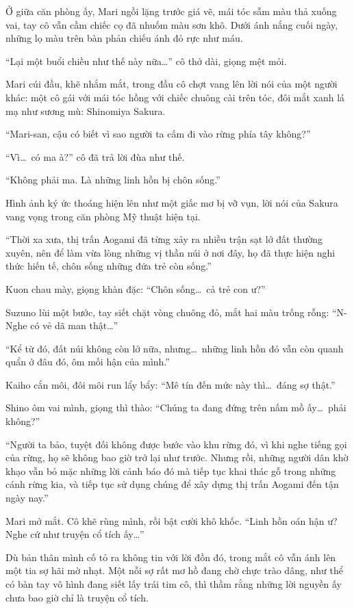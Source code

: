 \documentclass[../main.tex]{subfiles}
\begin{document}
Ở giữa căn phòng ấy, Mari ngồi lặng trước giá vẽ, mái tóc sẫm màu thả xuống vai, tay cô vẫn cầm chiếc cọ đã nhuốm màu sơn khô. Dưới ánh nắng cuối ngày, những lọ màu trên bàn phản chiếu ánh đỏ rực như máu.


``Lại một buổi chiều như thế này nữa\dots'' cô thở dài, giọng mệt mỏi.

Mari cúi đầu, khẽ nhắm mắt, trong đầu cô chợt vang lên lời nói của một người khác: một cô gái với mái tóc hồng với chiếc chuông cài trên tóc, đôi mắt xanh lá mạ như sương mù: Shinomiya Sakura.

``Mari-san, cậu có biết vì sao người ta cấm đi vào rừng phía tây không?''

``Vì\dots\ có ma à?'' cô đã trả lời đùa như thế.

``Không phải ma. Là những linh hồn bị chôn sống.''

Hình ảnh ký ức thoáng hiện lên như một giấc mơ bị vỡ vụn, lời nói của Sakura vang vọng trong căn phòng Mỹ thuật hiện tại.

``Thời xa xưa, thị trấn Aogami đã từng xảy ra nhiều trận sạt lở đất thường xuyên, nên để làm vừa lòng những vị thần núi ở nơi đây, họ đã thực hiện nghi thức hiến tế, chôn sống những đứa trẻ còn sống.''

Kuon chau mày, giọng khàn đặc: ``Chôn sống\dots\ cả trẻ con ư?''

Suzuno lùi một bước, tay siết chặt vòng chuông đỏ, mắt hai màu trống rỗng: ``N-Nghe có vẻ dã man thật\dots''

``Kể từ đó, đất núi không còn lở nữa, nhưng\dots\ những linh hồn đó vẫn còn quanh quẩn ở đâu đó, ôm mối hận của mình.''

Kaiho cắn môi, đôi môi run lẩy bẩy: ``Mê tín đến mức này thì\dots\ đáng sợ thật.''

Shino ôm vai mình, giọng thì thào: ``Chúng ta đang đứng trên nấm mồ ấy\dots\ phải không?''

``Người ta bảo, tuyệt đối không được bước vào khu rừng đó, vì khi nghe tiếng gọi của rừng, họ sẽ không bao giờ trở lại như trước. Nhưng rồi, những người dân khờ khạo vẫn bỏ mặc những lời cảnh báo đó mà tiếp tục khai thác gỗ trong những cánh rừng kia, và tiếp tục sử dụng chúng để xây dựng thị trấn Aogami đến tận ngày nay.''

Mari mở mắt. Cô khẽ rùng mình, rồi bật cười khô khốc. ``Linh hồn oán hận ư? Nghe cứ như truyện cổ tích ấy\dots''

Dù bản thân mình cố tỏ ra không tin với lời đồn đó,  trong mắt cô vẫn ánh lên một tia sợ hãi mờ nhạt. Một nỗi sợ rất mơ hồ đang chờ chực trào dâng, như thể có bàn tay vô hình đang siết lấy trái tim cô, thì thầm rằng những lời nguyền ấy chưa bao giờ chỉ là truyện cổ tích.
\end{document}
